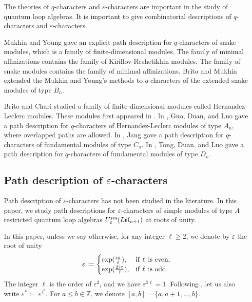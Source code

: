 \documentclass[12pt, reqno]{amsart}
\numberwithin{equation}{section}
\newcommand{\ZZ}{\mathbb{Z}}
\newcommand{\res}{{\rm res}}
\begin{document}
The theories of $q$-characters and $\varepsilon$-characters are important in the study of quantum loop algebras. It is important to give combinatorial descriptions of $q$-characters and $\varepsilon$-characters.

Mukhin and Young \cite{MY12a,MY12b} gave an explicit path description for $q$-characters of snake modules, which is a family of finite-dimensional modules. The family of minimal affinizations contains the family of Kirillov-Reshetikhin modules. The family of snake modules contains the family of minimal affinizations. Brito and Mukhin \cite{BM17} extended the Mukhin and Young's methods to $q$-characters of the extended snake modules of type $B_n$.

Brito and Chari \cite{BC19} studied a family of finite-dimensional modules called Hernandez-Leclerc modules. These modules first appeared in \cite{HL10,HL13}. In \cite{GDL22}, Guo, Duan, and Luo gave a path description for $q$-characters of Hernandez-Leclerc modules of type $A_n$, where overlapped paths are allowed. In \cite{J24}, Jang gave a path description for $q$-characters of fundamental modules of type $C_n$. In \cite{T23}, Tong, Duan, and Luo gave a path description for $q$-characters of fundamental modules of type $D_n$.

\subsection{Path description of $\varepsilon$-characters}
Path description of $\varepsilon$-characters has not been studied in the literature. In this paper, we study path descriptions for $\varepsilon$-characters of simple modules of type $A$ restricted quantum loop algebras $U_\varepsilon^{\res}({L\mathfrak{sl}_{n+1}})$ at roots of unity.

In this paper, unless we say otherwise, for any integer $\ell\geq 2$, we denote by $\varepsilon$ the root of unity
\begin{align*}
\varepsilon:=
\begin{cases} \text{exp}(\frac{i\pi}{\ell}), & \text{if}{\hskip 0.4em} \ell {\hskip 0.4em}\text{is even},\\
              \text{exp}(\frac{2i\pi}{\ell}), & \text{if}{\hskip 0.4em} \ell {\hskip 0.4em} \text{is odd}.
\end{cases}
\end{align*}
The integer $\ell$ is the order of $\varepsilon^{2}$, and we have $\varepsilon^{2 \ell}=1$. Following \cite{FM02}, let us also write $\varepsilon^{*}:=\varepsilon^{\ell^2}$. For $a\leq b \in \ZZ$, we denote $[a,b]=\{a,a+1,\ldots,b\}$.
\end{document}
